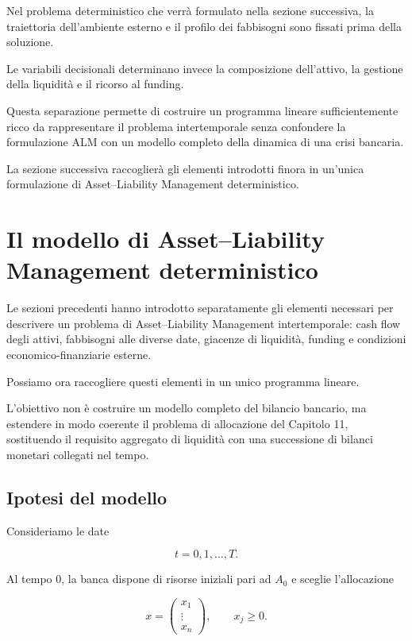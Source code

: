 Nel problema deterministico che verr\`a formulato nella sezione successiva,
la traiettoria dell'ambiente esterno e il profilo dei fabbisogni sono fissati
prima della soluzione.

Le variabili decisionali determinano invece la composizione dell'attivo, la
gestione della liquidit\`a e il ricorso al funding.

Questa separazione permette di costruire un programma lineare sufficientemente
ricco da rappresentare il problema intertemporale senza confondere la
formulazione ALM con un modello completo della dinamica di una crisi bancaria.

La sezione successiva raccoglier\`a gli elementi introdotti finora in un'unica
formulazione di Asset--Liability Management deterministico.

\section{Il modello di Asset--Liability Management deterministico}

\label{sec:cap12-modello-alm-completo}

Le sezioni precedenti hanno introdotto separatamente gli elementi necessari
per descrivere un problema di Asset--Liability Management intertemporale:
cash flow degli attivi, fabbisogni alle diverse date, giacenze di liquidit\`a,
funding e condizioni economico-finanziarie esterne.

Possiamo ora raccogliere questi elementi in un unico programma lineare.

L'obiettivo non \`e costruire un modello completo del bilancio bancario, ma
estendere in modo coerente il problema di allocazione del Capitolo 11,
sostituendo il requisito aggregato di liquidit\`a con una successione di
bilanci monetari collegati nel tempo.

\subsection{Ipotesi del modello}

Consideriamo le date

\[
t=0,1,\ldots,T.
\]

Al tempo $0$, la banca dispone di risorse iniziali pari ad $A_0$ e sceglie
l'allocazione

\[
x=
\begin{pmatrix}
x_1\\
\vdots\\
x_n
\end{pmatrix},
\qquad
x_j\geq0.
\]

